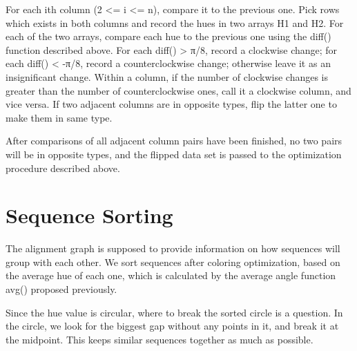 For each ith column (2 <= i <= n), compare it to the previous one. Pick rows which exists in both columns and record the hues in two arrays H1 and H2. For each of the two arrays, compare each hue to the previous one using the diff() function described above. For each diff() > π/8, record a clockwise change; for each diff() < -π/8, record a counterclockwise change; otherwise leave it as an insignificant change. Within a column, if the number of clockwise changes is greater than the number of counterclockwise ones, call it a clockwise column, and vice versa. If two adjacent columns are in opposite types, flip the latter one to make them in same type.

After comparisons of all adjacent column pairs have been finished, no two pairs will be in opposite types, and the flipped data set is passed to the optimization procedure described above.

\section{Sequence Sorting}

The alignment graph is supposed to provide information on how sequences will group with each other. We sort sequences after coloring optimization, based on the average hue of each one, which is calculated by the average angle function avg() proposed previously.

Since the hue value is circular, where to break the sorted circle is a question. In the circle, we look for the biggest gap without any points in it, and break it at the midpoint. This keeps similar sequences together as much as possible.